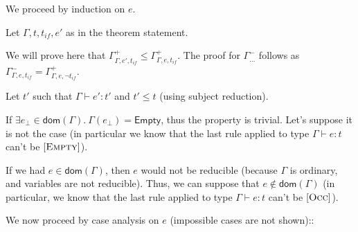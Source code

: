 \documentclass[a4paper]{article}%
\newcommand{\dom}[1]{\textsf{dom}(#1)}
\newcommand{\Empty} {\textsf{Empty}}%
\theoremstyle{definition}
\newcommand {\Rule}[1] {[\textsc{#1}]}
\begin{document}
        We proceed by induction on $e$.
    
        Let $\Gamma,t,t_{if},e'$ as in the theorem statement.
        
        We will prove here that $\Gamma^+_{\Gamma,e',t_{if}} \leq \Gamma^+_{\Gamma,e,t_{if}}$.
        The proof for $\Gamma^-_{\dots}$ follows as $\Gamma^-_{\Gamma,e,t_{if}}=\Gamma^+_{\Gamma,e,\neg t_{if}}$.
    
        Let $t'$ such that $\Gamma \vdash e':t'$ and $t'\leq t$ (using subject reduction).
    
        If $\exists e_{\bot} \in \dom\Gamma.\ \Gamma(e_{\bot}) = \Empty$, thus the property is trivial.
        Let's suppose it is not the case (in particular we know that the last rule applied to type $\Gamma \vdash e:t$ can't be $\Rule{Empty}$).
    
        If we had $e\in\dom\Gamma$, then $e$ would not be reducible (because $\Gamma$ is ordinary, and variables are not reducible).
        Thus, we can suppose that $e\not\in\dom\Gamma$ (in particular, we know that the last rule applied to type $\Gamma \vdash e:t$ can't be $\Rule{Occ}$).
    
        We now proceed by case analysis on $e$ (impossible cases are not shown)::
    
\end{document}

